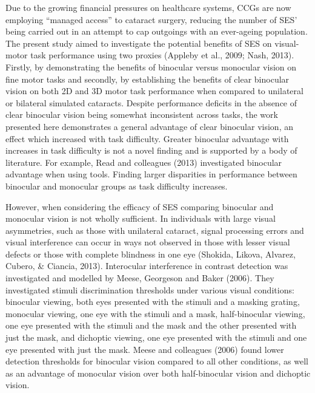 \documentclass[
  english,
  man,floatsintext]{apa6}
\begin{document}
Due to the growing financial pressures on healthcare systems, CCGs are now employing \enquote{managed access} to cataract surgery, reducing the number of SES' being carried out in an attempt to cap outgoings with an ever-ageing population.
The present study aimed to investigate the potential benefits of SES on visual-motor task performance using two proxies (Appleby et al., 2009; Nash, 2013).
Firstly, by demonstrating the benefits of binocular versus monocular vision on fine motor tasks and secondly, by establishing the benefits of clear binocular vision on both 2D and 3D motor task performance when compared to unilateral or bilateral simulated cataracts.
Despite performance deficits in the absence of clear binocular vision being somewhat inconsistent across tasks, the work presented here demonstrates a general advantage of clear binocular vision, an effect which increased with task difficulty.
Greater binocular advantage with increases in task difficulty is not a novel finding and is supported by a body of literature.
For example, Read and colleagues (2013) investigated binocular advantage when using tools. Finding larger disparities in performance between binocular and monocular groups as task difficulty increases.

However, when considering the efficacy of SES comparing binocular and monocular vision is not wholly sufficient.
In individuals with large visual asymmetries, such as those with unilateral cataract, signal processing errors and visual interference can occur in ways not observed in those with lesser visual defects or those with complete blindness in one eye (Shokida, Likova, Alvarez, Cubero, \& Ciancia, 2013).
Interocular interference in contrast detection was investigated and modelled by Meese, Georgeson and Baker (2006).
They investigated stimuli discrimination thresholds under various visual conditions: binocular viewing, both eyes presented with the stimuli and a masking grating, monocular viewing, one eye with the stimuli and a mask, half-binocular viewing, one eye presented with the stimuli and the mask and the other presented with just the mask, and dichoptic viewing, one eye presented with the stimuli and one eye presented with just the mask.
Meese and colleagues (2006) found lower detection thresholds for binocular vision compared to all other conditions, as well as an advantage of monocular vision over both half-binocular vision and dichoptic vision.
\end{document}
